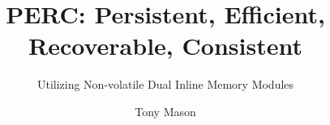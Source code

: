 \documentclass[sigplan, draft]{acmart}
\begin{document}
\title{PERC: Persistent, Efficient, Recoverable, Consistent}
\subtitle{Utilizing Non-volatile Dual Inline Memory Modules}

\author{Tony Mason}

\renewcommand{\shortauthors}{T. Mason}



%
%
\begin{comment}
\begin{CCSXML}
<ccs2012>
 <concept>
  <concept_id>10010520.10010553.10010562</concept_id>
  <concept_desc>Computer systems organization~Embedded systems</concept_desc>
  <concept_significance>500</concept_significance>
 </concept>
 <concept>
  <concept_id>10010520.10010575.10010755</concept_id>
  <concept_desc>Computer systems organization~Redundancy</concept_desc>
  <concept_significance>300</concept_significance>
 </concept>
 <concept>
  <concept_id>10010520.10010553.10010554</concept_id>
  <concept_desc>Computer systems organization~Robotics</concept_desc>
  <concept_significance>100</concept_significance>
 </concept>
 <concept>
  <concept_id>10003033.10003083.10003095</concept_id>
  <concept_desc>Networks~Network reliability</concept_desc>
  <concept_significance>100</concept_significance>
 </concept>
</ccs2012>
\end{CCSXML}

\ccsdesc[500]{Computer systems organization~Embedded systems}
\ccsdesc[300]{Computer systems organization~Redundancy}
\ccsdesc{Computer systems organization~Robotics}
\ccsdesc[100]{Networks~Network reliability}


\keywords{ACM proceedings, \LaTeX, text tagging}
\end{comment}

\maketitle

%



\end{document}
